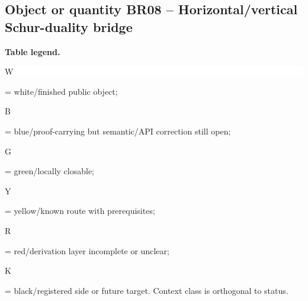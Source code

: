 \subsection*{Object or quantity BR08 -- Horizontal/\allowbreak{}vertical Schur-duality bridge}
\hypertarget{objproof:BR08}{}
\par\smallskip\noindent\begin{minipage}{0.99\linewidth}\footnotesize\raggedright\textbf{Table legend.} \colorbox{white}{\strut W} = white/finished public object; \colorbox{cyan!20}{\strut B} = blue/proof-carrying but semantic/API correction still open; \colorbox{green!18}{\strut G} = green/locally closable; \colorbox{yellow!25}{\strut Y} = yellow/known route with prerequisites; \colorbox{red!20}{\strut R} = red/derivation layer incomplete or unclear; \colorbox{black!18}{\strut K} = black/registered side or future target. Context class is orthogonal to status.\end{minipage}\par\vspace{0.25em}
